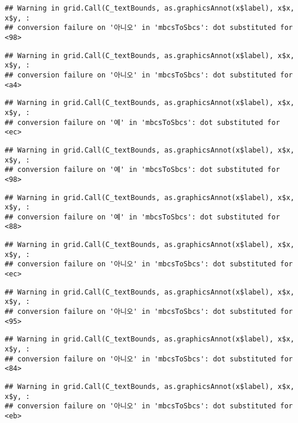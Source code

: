 \documentclass[
]{article}
\begin{document}
\begin{verbatim}
## Warning in grid.Call(C_textBounds, as.graphicsAnnot(x$label), x$x, x$y, :
## conversion failure on '아니오' in 'mbcsToSbcs': dot substituted for <98>
\end{verbatim}

\begin{verbatim}
## Warning in grid.Call(C_textBounds, as.graphicsAnnot(x$label), x$x, x$y, :
## conversion failure on '아니오' in 'mbcsToSbcs': dot substituted for <a4>
\end{verbatim}

\begin{verbatim}
## Warning in grid.Call(C_textBounds, as.graphicsAnnot(x$label), x$x, x$y, :
## conversion failure on '예' in 'mbcsToSbcs': dot substituted for <ec>
\end{verbatim}

\begin{verbatim}
## Warning in grid.Call(C_textBounds, as.graphicsAnnot(x$label), x$x, x$y, :
## conversion failure on '예' in 'mbcsToSbcs': dot substituted for <98>
\end{verbatim}

\begin{verbatim}
## Warning in grid.Call(C_textBounds, as.graphicsAnnot(x$label), x$x, x$y, :
## conversion failure on '예' in 'mbcsToSbcs': dot substituted for <88>
\end{verbatim}

\begin{verbatim}
## Warning in grid.Call(C_textBounds, as.graphicsAnnot(x$label), x$x, x$y, :
## conversion failure on '아니오' in 'mbcsToSbcs': dot substituted for <ec>
\end{verbatim}

\begin{verbatim}
## Warning in grid.Call(C_textBounds, as.graphicsAnnot(x$label), x$x, x$y, :
## conversion failure on '아니오' in 'mbcsToSbcs': dot substituted for <95>
\end{verbatim}

\begin{verbatim}
## Warning in grid.Call(C_textBounds, as.graphicsAnnot(x$label), x$x, x$y, :
## conversion failure on '아니오' in 'mbcsToSbcs': dot substituted for <84>
\end{verbatim}

\begin{verbatim}
## Warning in grid.Call(C_textBounds, as.graphicsAnnot(x$label), x$x, x$y, :
## conversion failure on '아니오' in 'mbcsToSbcs': dot substituted for <eb>
\end{verbatim}
\end{document}

